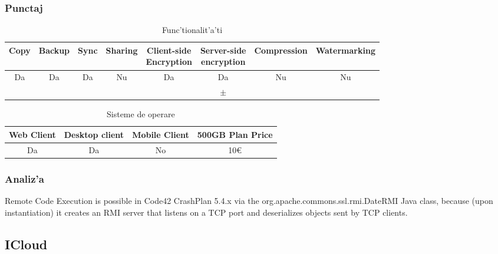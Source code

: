 \documentclass[12pt,a4paper,twoside]{report}
\newcommand{\greencheck}{\color{green}  \ding{51}}
\newcommand{\orangepm}{\color{orange} \textbf{$\pm$}}
\newcommand{\redxmark}{\color{red} \ding{55}}
\begin{document}
\subsubsection{Punctaj}
\begin{table}[H]
\centering
\caption{Func'tionalit'a'ti}
\begin{tabular}{|c|c|c|c|c|c|c|c|}          
\hline               
Copy & Backup & Sync & Sharing & \makecell{Client-side\\ Encryption} & \makecell{Server-side \\ encryption} & Compression & Watermarking \\ [0.5ex]   
\hline 
Da & Da & Da & Nu & Da &  Da  & Nu & Nu    \\                      
\greencheck & \greencheck & \redxmark\redxmark & \redxmark\redxmark & \greencheck\greencheck & \orangepm &  \redxmark\redxmark &  \redxmark\redxmark  \\               
\hline                              
\end{tabular}
\label{table:crashplanfeaturetable}             
\end{table}
\begin{table}[H]
\centering
\caption{Sisteme de operare}
\begin{tabular}{|c|c|c|c|}          
\hline                      
 Web Client & Desktop client & Mobile Client & 500GB Plan Price\\ [0.5ex]   
\hline                            
Da & Da & No & 10\euro \\               
\hline                              
\end{tabular}
\label{table:crashplansystemtable}             
\end{table}
\subsubsection{Analiz'a}
Remote Code Execution is possible in Code42 CrashPlan 5.4.x via the org.apache.commons.ssl.rmi.DateRMI Java class, because (upon instantiation) it creates an RMI server that listens on a TCP port and deserializes objects sent by TCP clients.	
\subsection{ICloud}
\end{document}
